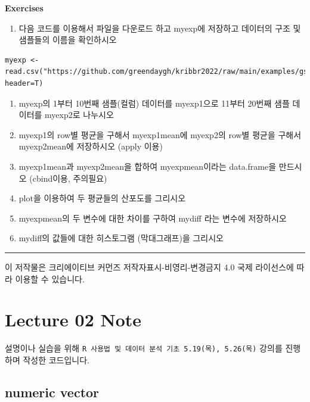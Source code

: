\documentclass[
]{book}
\providecommand{\tightlist}{%
  \setlength{\itemsep}{0pt}\setlength{\parskip}{0pt}}
\begin{document}
\textbf{Exercises}

\begin{enumerate}
\def\labelenumi{\arabic{enumi}.}
\tightlist
\item
  다음 코드를 이용해서 파일을 다운로드 하고 myexp에 저장하고 데이터의 구조 및 샘플들의 이름을 확인하시오
\end{enumerate}

\begin{verbatim}
myexp <- read.csv("https://github.com/greendaygh/kribbr2022/raw/main/examples/gse93819_expression_values.csv", header=T)
\end{verbatim}

\begin{enumerate}
\def\labelenumi{\arabic{enumi}.}
\setcounter{enumi}{1}
\item
  myexp의 1부터 10번째 샘플(컬럼) 데이터를 myexp1으로 11부터 20번째 샘플 데이터를 myexp2로 나누시오
\item
  myexp1의 row별 평균을 구해서 myexp1mean에 myexp2의 row별 평균을 구해서 myexp2mean에 저장하시오 (apply 이용)
\item
  myexp1mean과 myexp2mean을 합하여 myexpmean이라는 data.frame을 만드시오 (cbind이용, 주의필요)
\item
  plot을 이용하여 두 평균들의 산포도를 그리시오
\item
  myexpmean의 두 변수에 대한 차이를 구하여 mydiff 라는 변수에 저장하시오
\item
  mydiff의 값들에 대한 히스토그램 (막대그래프)을 그리시오
\end{enumerate}

\begin{center}\rule{0.5\linewidth}{0.5pt}\end{center}

이 저작물은 크리에이티브 커먼즈 저작자표시-비영리-변경금지 4.0 국제 라이선스에 따라 이용할 수 있습니다.

\hypertarget{lecture-02-note}{%
\chapter{Lecture 02 Note}\label{lecture-02-note}}

설명이나 실습을 위해 \texttt{R\ 사용법\ 및\ 데이터\ 분석\ 기초\ 5.19(목),\ 5.26(목)} 강의를 진행하며 작성한 코드입니다.

\hypertarget{numeric-vector}{%
\section{numeric vector}\label{numeric-vector}}
\end{document}
